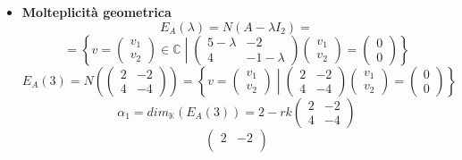 \documentclass[a4paper]{article}
\theoremstyle{break}
\theoremstyle{break}
\theoremstyle{break}
\theoremstyle{break}
\begin{document}
\begin{example}
\begin{itemize}
    \item \textbf{Molteplicità geometrica}
      \[
      E_A(\lambda) = N(A - \lambda I_2) = 
      \] 
      \[
      = \left\{\left. v = \begin{pmatrix} v_1\\v_2 \end{pmatrix} \in \mathbb{C} \;\right|\;
          \begin{pmatrix} 
            5 - \lambda & -2\\
            4 & -1 - \lambda
          \end{pmatrix} 
          \begin{pmatrix} 
            v_1\\
            v_2
          \end{pmatrix} 
          =
          \begin{pmatrix} 
            0\\
            0
          \end{pmatrix} 
        \right\} 
      \] 
      \vspace{1em}
      \[
      E_A(3) = N \left( \begin{pmatrix} 
          2 & -2\\
          4 & -4
      \end{pmatrix}  \right) 
      =
      \left\{\left. v = \begin{pmatrix} v_1\\v_2 \end{pmatrix} \;\right|\;
          \begin{pmatrix} 
            2 & -2\\
            4 & -4
          \end{pmatrix} 
          \begin{pmatrix} 
            v_1\\
            v_2
          \end{pmatrix} 
          =
          \begin{pmatrix} 
            0\\
            0
          \end{pmatrix} 
        \right\} 
      \] 
      \[
        \alpha_1 = dim_{\mathbb{K}}(E_A(3)) = 2 - rk \begin{pmatrix} 
          2 & -2\\
          4 & -4
        \end{pmatrix}
      \] 
      \[
      \begin{pmatrix} 
        2 & -2\\

\end{pmatrix}\]
\end{itemize}
\end{example}
\end{document}
